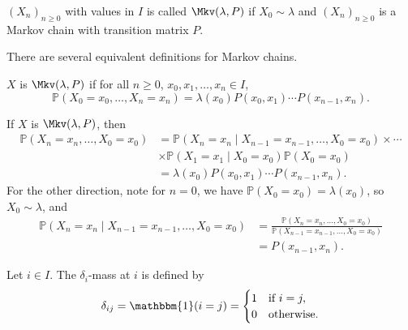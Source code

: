 \documentclass[12pt]{article}
\begin{document}
\begin{definition}
	$(X_n)_{n \geq 0}$ with values in $I$ is called $\Mkv(\lambda, P)$ if $X_0 \sim \lambda$ and $(X_n)_{n \geq 0}$ is a Markov chain with transition matrix $P$.
\end{definition}

There are several equivalent definitions for Markov chains.

\begin{theorem}
	$X$ is $\Mkv(\lambda, P)$ if for all $n \geq 0$, $x_0, x_1, \ldots, x_n \in I$,
	\[
		\mathbb{P}(X_0 = x_0, \ldots, X_n = x_n) = \lambda(x_0)P(x_0,x_1) \cdots P(x_{n-1}, x_n)
	.\]
\end{theorem}

\begin{proofbox}
	If $X$ is $\Mkv(\lambda, P)$, then 
	\begin{align*}
		\mathbb{P}(X_n = x_n, \ldots, X_0 = x_0) &= \mathbb{P}(X_n = x_n \mid X_{n-1} = x_{n-1}, \ldots, X_0 = x_0) \times \cdots \\
							 & \times \mathbb{P}(X_1 = x_1 \mid X_0 = x_0) \mathbb{P}(X_0 = x_0) \\
							 &= \lambda(x_0)P(x_0,x_1)\cdots P(x_{n-1}, x_n).
	\end{align*}
	For the other direction, note for $n = 0$, we have $\mathbb{P}(X_0 = x_0) = \lambda(x_0)$, so $X_0 \sim \lambda$, and
	\begin{align*}
		\mathbb{P}(X_n = x_n \mid X_{n-1} = x_{n-1}, \ldots, X_0 = x_0) &= \frac{\mathbb{P}(X_n = x_n, \ldots, X_0 = x_0)}{\mathbb{P}(X_{n-1} = x_{n-1}, \ldots, X_0 = x_0)} \\
										&= P(x_{n-1}, x_n).
	\end{align*}
\end{proofbox}

\begin{definition}
	Let $i \in I$. The $\delta_{i}$-mass at $i$ is defined by
	\[
		\delta_{ij} = \mathbbm{1}(i = j) =
		\begin{cases}
			1 & \text{if } i = j, \\
			0 & \text{otherwise}.
		\end{cases}	
	\] 
\end{definition}
\end{document}
